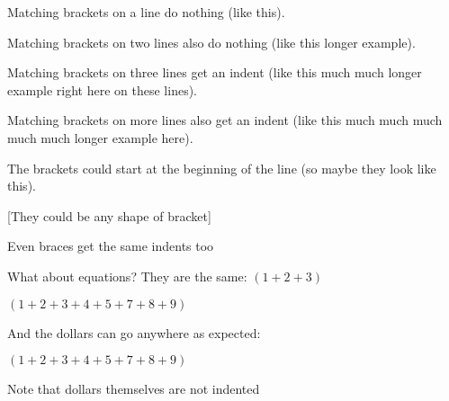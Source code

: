 \documentclass{article}
\begin{document}
Matching brackets on a line do nothing (like this).

Matching brackets on two lines also do nothing (like this
longer example).

Matching brackets on three lines get an indent (like this
  much much longer example
right here on these lines).

Matching brackets on more lines also get an indent (like this
  much much
  much much
  much longer example
here).

The brackets could start at the beginning of the line
(so maybe
  they look
like this).

[They could
  be any shape
of bracket]

{Even braces get
  the same
indents too}

What about equations? They are the same:
$(1 + 2 + 3)$

$(1 + 2
  + 3 + 4
  + 5 + 7
+ 8 + 9)$

And the dollars can go anywhere as expected:

$
(1 + 2
  + 3 + 4
  + 5 + 7
+ 8 + 9)
$

Note that dollars themselves are not indented
\end{document}
